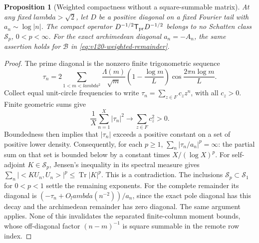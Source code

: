 \documentclass[11pt]{article}
\def\lambda{lambda}%
\def\ip#1#2{<#1,#2>}%
\newtheorem{proposition}[theorem]{Proposition}
\theoremstyle{remark}
\newcommand{\ip}[2]{\left\langle #1,#2\right\rangle}
\begin{document}
\begin{proposition}[Weighted compactness without a square-summable matrix]
\label{prop:v120-not-schatten}
At any fixed $\lambda>\sqrt2$, let $D$ be a positive diagonal on a
fixed Fourier tail with $a_n\sim\log|n|$. The compact operator
$D^{-1/2}\mathsf T_{\rm pr}D^{-1/2}$ belongs to no Schatten class
$\mathcal S_p$, $0<p<\infty$. For the exact archimedean diagonal
$a_n=-A_n$, the same assertion holds for
$\mathcal B$ in \eqref{eq:v120-weighted-remainder}.
\end{proposition}
\begin{proof}
The prime diagonal is the nonzero finite trigonometric sequence
\[
 \tau_n=2\sum_{1<m<\lambda^2}
 \frac{\Lambda(m)}{\sqrt m}
 \left(1-\frac{\log m}{L}\right)
 \cos\frac{2\pi n\log m}{L}.
\]
Collect equal unit-circle frequencies to write
$\tau_n=\sum_{z\in F}c_z z^n$, with all $c_z>0$.
Finite geometric sums give
\[
 \frac1X\sum_{n=1}^X|\tau_n|^2\longrightarrow
 \sum_{z\in F}c_z^2>0.
\]
Boundedness then implies that $|\tau_n|$ exceeds a positive
constant on a set of positive lower density. Consequently, for each
$p\ge1$, $\sum_n|\tau_n/a_n|^p=\infty$: the partial sum on
that set is bounded below by a constant times $X/(\log X)^p$.
For self-adjoint $K\in\mathcal S_p$, Jensen's inequality in its
spectral measure gives
$\sum_n|\ip{KU_n}{U_n}|^p\le\operatorname{Tr}|K|^p$.
This is a contradiction. The inclusions
$\mathcal S_p\subset\mathcal S_1$ for $0<p<1$ settle the
remaining exponents. For the complete remainder its diagonal is
$(-\tau_n+O_\lambda(n^{-2}))/a_n$, since the exact pole diagonal
has this decay and the archimedean remainder has zero diagonal.
The same argument applies. None of this invalidates the separated
finite-column moment bounds, whose off-diagonal factor
$(n-m)^{-1}$ is square summable in the remote row index.
\end{proof}
\end{document}
